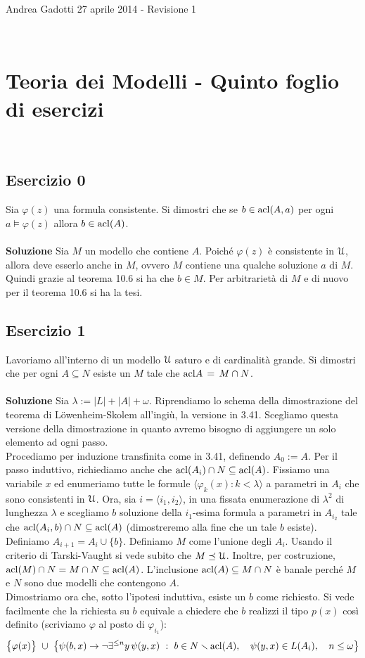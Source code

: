 \documentclass[10pt,a4paper]{article}
\def\phi{\varphi}
\def\U{\EuScript U}
\def\<{\langle}
\def\>{\rangle}
\def\E{\exists}
\def\imp{\rightarrow}
\def\acl{{\rm acl}}
\def\models{\vDash}
\def\sm{\smallsetminus}
\begin{document}
\noindent Andrea Gadotti \hfill 27 aprile 2014 - Revisione 1 

\

\section*{Teoria dei Modelli - Quinto foglio di esercizi}

\

\subsection*{Esercizio 0}

Sia $\phi(z)$ una formula consistente. Si dimostri che se $b \in \acl(A,a)$ per ogni $a \models \phi(z)$ allora $b \in \acl(A)$.\\
\\
\noindent\textbf{Soluzione} Sia $M$ un modello che contiene $A$. Poiché $\phi(z)$ è consistente in $\U$, allora deve esserlo anche in $M$, ovvero $M$ contiene una qualche soluzione $a$ di $M$. Quindi grazie al teorema 10.6 si ha che $b \in M$. Per arbitrarietà di $M$ e di nuovo per il teorema 10.6 si ha la tesi.


\subsection*{Esercizio 1}
Lavoriamo all'interno di un modello $\U$ saturo e di cardinalità grande. Si dimostri che per ogni $A\subseteq N$ esiste un $M$ tale che $\acl A\,=\,M\cap N$.\\
\\
\noindent\textbf{Soluzione} Sia $\lambda:=|L|+|A|+\omega$. Riprendiamo lo schema della dimostrazione del teorema di Löwenheim-Skolem all'ingiù, la versione in 3.41. Scegliamo questa versione della dimostrazione in quanto avremo bisogno di aggiungere un solo elemento ad ogni passo.\\
Procediamo per induzione transfinita come in 3.41, definendo $A_0:=A$. Per il passo induttivo, richiediamo anche che $\acl(A_i)\cap N\subseteq\acl(A)$. Fissiamo una variabile $x$ ed enumeriamo tutte le formule $\langle \phi_k(x): k < \lambda \rangle$ a parametri in $A_i$ che sono consistenti in $\U$. Ora, sia $i=\<i_1,i_2\>$, in una fissata enumerazione di $\lambda^2$  di lunghezza $\lambda$ e scegliamo $b$ soluzione della $i_1$-esima formula a parametri in $A_{i_2}$ tale che $\acl(A_i,b)\cap N\subseteq\acl(A)$ (dimostreremo alla fine che un tale $b$ esiste). Definiamo $A_{i+1}=A_i\cup\{b\}$. Definiamo $M$ come l'unione degli $A_i$. Usando il criterio di Tarski-Vaught si vede subito che $M \preceq \U$. Inoltre, per costruzione, $\acl(M) \cap N = M \cap N \subseteq \acl(A)$. L'inclusione $\acl(A) \subseteq M \cap N$ è banale perché $M$ e $N$ sono due modelli che contengono $A$.\\
Dimostriamo ora che, sotto l'ipotesi induttiva, esiste un $b$ come richiesto. Si vede facilmente che la richiesta su $b$ equivale a chiedere che $b$ realizzi il tipo $p(x)$ così definito (scriviamo $\phi$ al posto di $\phi_{i_1}$):
$$\big\{\phi(x)\big\} \ \cup \ \big\{\psi(b,x)\imp\neg\E^{\le n}y\,\psi(y,x)\ :\ b\in N\sm\acl(A),\ \ \ \psi(y,x)\in L(A_i),\ \ \ n\le\omega\big\}$$
\end{document}
